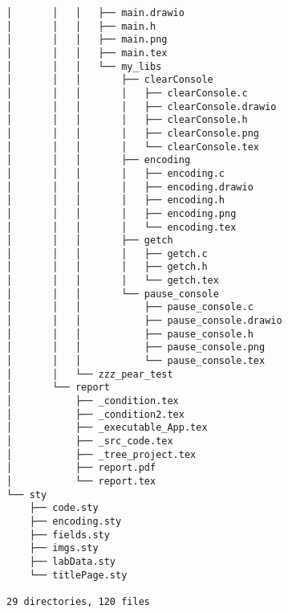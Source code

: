 \begin{verbatim}
│       │   │   ├── main.drawio
│       │   │   ├── main.h
│       │   │   ├── main.png
│       │   │   ├── main.tex
│       │   │   └── my_libs
│       │   │       ├── clearConsole
│       │   │       │   ├── clearConsole.c
│       │   │       │   ├── clearConsole.drawio
│       │   │       │   ├── clearConsole.h
│       │   │       │   ├── clearConsole.png
│       │   │       │   └── clearConsole.tex
│       │   │       ├── encoding
│       │   │       │   ├── encoding.c
│       │   │       │   ├── encoding.drawio
│       │   │       │   ├── encoding.h
│       │   │       │   ├── encoding.png
│       │   │       │   └── encoding.tex
│       │   │       ├── getch
│       │   │       │   ├── getch.c
│       │   │       │   ├── getch.h
│       │   │       │   └── getch.tex
│       │   │       └── pause_console
│       │   │           ├── pause_console.c
│       │   │           ├── pause_console.drawio
│       │   │           ├── pause_console.h
│       │   │           ├── pause_console.png
│       │   │           └── pause_console.tex
│       │   └── zzz_pear_test
│       └── report
│           ├── _condition.tex
│           ├── _condition2.tex
│           ├── _executable_App.tex
│           ├── _src_code.tex
│           ├── _tree_project.tex
│           ├── report.pdf
│           └── report.tex
└── sty
    ├── code.sty
    ├── encoding.sty
    ├── fields.sty
    ├── imgs.sty
    ├── labData.sty
    └── titlePage.sty

29 directories, 120 files
\end{verbatim}